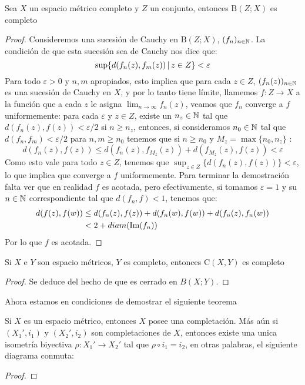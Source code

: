 \documentclass[12pt,a4paper]{book}
\begin{document}
\begin{prop}
Sea $X$ un espacio métrico completo y $Z$ un conjunto, entonces $\mathrm{B}(Z;X)$ es completo
\begin{proof}
Consideremos una sucesión de Cauchy en $\mathrm{B}(Z;X)$, $(f_n)_{{n} \in \mathbb{N}}$. La condición de que esta sucesión sea de Cauchy nos dice que:
$$\sup \{ d(f_n(z),f_m(z)) \,\vert\, z \in Z \} < \varepsilon$$
Para todo $\varepsilon >0$ y $n,m$ apropiados, esto implica que para cada $z \in Z$, $(f_n(z))_{{n} \in \mathbb{N}}$ es una sucesión de Cauchy en $X$, y por lo tanto tiene límite, llamemos $f:Z \rightarrow X$ a la función que a cada $z$ le asigna $\displaystyle \lim_{n \to \infty} f_n(z)$, veamos que $f_n$ converge a $f$ uniformemente: para cada $\varepsilon$ y $z \in Z$, existe un $n_z \in \mathbb{N}$ tal que $d(f_n(z),f(z))<\varepsilon/2$ si $n \geq n_z$, entonces, si consideramos $n_0 \in \mathbb{N}$ tal que $d(f_n,f_m)<\varepsilon/2$ para $n,m \geq n_0$ tenemos que si $n \geq n_0$ y $M_z = \max\{ n_0, n_z\}$ : 
$$d(f_n(z),f(z)) \leq d(f_n(z),f_{M_z}(z)) + d(f_{M_z}(z),f(z))< \varepsilon$$
Como esto vale para todo $z \in Z$, tenemos que $\sup_{z \in Z}\{d(f_n(z),f(z))\}<\varepsilon$, lo que implica que converge a $f$ uniformemente. Para terminar la demostración falta ver que en realidad $f$ es acotada, pero efectivamente, si tomamos $\varepsilon = 1$ y su $n \in \mathbb{N}$ correspondiente tal que $d(f_n,f)<1$,  tenemos que:
\begin{align*}
d(f(z),f(w)) &\leq d(f_n(z),f(z)) + d(f_n(w),f(w)) + d(f_n(z),f_n(w)) \\
&< 2 + diam(\mbox{Im}(f_n))
\end{align*} 
Por lo que $f$ es acotada.
\end{proof}
\end{prop}
\begin{cor}
Si $X$ e $Y$ son espacio métricos, $Y$ es completo, entonces $\mathrm{C}(X,Y)$ es completo
\begin{proof}
Se deduce del hecho de que es cerrado en $B(X;Y)$.
\end{proof}
\end{cor}
Ahora estamos en condiciones de demostrar el siguiente teorema
\begin{teo}
Si $X$ es un espacio métrico, entonces $X$ posee una completación. Más aún si $(X_1',i_1)$ y $(X_2',i_2)$ son completaciones de $X$, entonces existe una unica isometría biyectiva $\rho:X_1' \rightarrow X_2'$ tal que $\rho \circ i_1 = i_2$, en otras palabras, el siguiente diagrama conmuta:
\begin{proof} 
\end{proof}
\end{teo}

\ifx\isEmbedded\undefined
\end{document}
